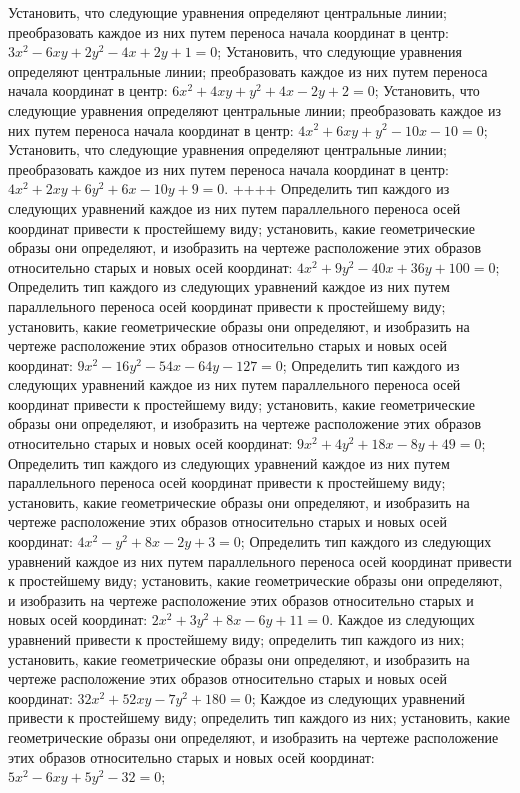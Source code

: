 Установить, что следующие уравнения определяют центральные линии; преобразовать каждое из них путем переноса начала координат в центр: $3 x^2-6 x y+2 y^2-4 x+2 y+1=0$;
Установить, что следующие уравнения определяют центральные линии; преобразовать каждое из них путем переноса начала координат в центр: $6 x^2+4 x y+y^2+4 x-2 y+2=0$;
Установить, что следующие уравнения определяют центральные линии; преобразовать каждое из них путем переноса начала координат в центр: $4 x^2+6 x y+y^2-10 x-10=0$;
Установить, что следующие уравнения определяют центральные линии; преобразовать каждое из них путем переноса начала координат в центр: $4 x^2+2 x y+6 y^2+6 x-10 y+9=0$.
++++
Определить тип каждого из следующих уравнений каждое из них путем параллельного переноса осей координат привести к простейшему виду; установить, какие геометрические образы они определяют, и изобразить на чертеже расположение этих образов относительно старых и новых осей координат: $4 x^2+9 y^2-40 x+36 y+100=0$;
Определить тип каждого из следующих уравнений каждое из них путем параллельного переноса осей координат привести к простейшему виду; установить, какие геометрические образы они определяют, и изобразить на чертеже расположение этих образов относительно старых и новых осей координат: $9 x^2-16 y^2-54 x-64 y-127=0$;
Определить тип каждого из следующих уравнений каждое из них путем параллельного переноса осей координат привести к простейшему виду; установить, какие геометрические образы они определяют, и изобразить на чертеже расположение этих образов относительно старых и новых осей координат: $9 x^2+4 y^2+18 x-8 y+49=0$;
Определить тип каждого из следующих уравнений каждое из них путем параллельного переноса осей координат привести к простейшему виду; установить, какие геометрические образы они определяют, и изобразить на чертеже расположение этих образов относительно старых и новых осей координат: $4 x^2-y^2+8 x-2 y+3=0$;
Определить тип каждого из следующих уравнений каждое из них путем параллельного переноса осей координат привести к простейшему виду; установить, какие геометрические образы они определяют, и изобразить на чертеже расположение этих образов относительно старых и новых осей координат: $2 x^2+3 y^2+8 x-6 y+11=0$.
Каждое из следующих уравнений привести к простейшему виду; определить тип каждого из них; установить, какие геометрические образы они определяют, и изобразить на чертеже расположение этих образов относительно старых и новых осей координат: $32 x^2+52 x y-7 y^2+180=0$;
Каждое из следующих уравнений привести к простейшему виду; определить тип каждого из них; установить, какие геометрические образы они определяют, и изобразить на чертеже расположение этих образов относительно старых и новых осей координат: $5 x^2-6 x y+5 y^2-32=0$;

